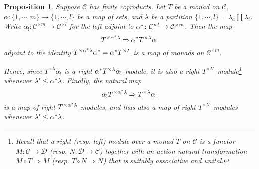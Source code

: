 \documentclass[a4paper,10pt
,draft
]{article}%
\numberwithin{equation}{section}
\numberwithin{figure}{section}
\newtheorem{proposition}[equation]{Proposition}%
\theoremstyle{definition} %
\newcommand{\C}{\ensuremath{\mathcal C}}
\newcommand{\1}{\ensuremath{\mathbbm 1}}%
\begin{document}
\begin{proposition}\label{MONADICFUN PROP}
	Suppose $\C$ has finite coproducts.
	Let $T$ be a monad on $\C$,
	$\alpha \colon \{1,\cdots,m\} \to \{1,\cdots,l\}$ be a map of sets,
	and $\lambda$ be a partition $\{1,\cdots,l\} = \lambda_a \amalg \lambda_i$.
	Write $\alpha_{!} \colon \mathcal{C}^{\times m} \to 
	\mathcal{C}^{\times l}$
	for the left adjoint to 
	$\alpha^{\**} \colon \mathcal{C}^{\times l} \to 
	\mathcal{C}^{\times m}$.
% 	 
	Then the map
\begin{equation}\label{MONADFUNCTORALPHA EQ}
	T^{\times \alpha^{\**} \lambda} \Rightarrow \alpha^{\**} T^{\times \lambda} \alpha_{!}
\end{equation}
adjoint to the identity 
$T^{\times \alpha^{\**}\lambda} \alpha^{\**} =
\alpha^{\**} T^{\times \lambda}$
is a map of monads on $\C^{\times m}$.

Hence, since $T^{\times \lambda} \alpha_!$ is a right 
$\alpha^{\**} T^{\times \lambda}\alpha_{!}$-module, 
it is also a right $T^{\times \lambda'}$-module\footnote{
Recall that a right (resp. left) module
over a monad $T$ on $\mathcal{C}$
is a functor $M \colon \mathcal{C} \to \mathcal{D}$
(resp. $N \colon \mathcal{D} \to \mathcal{C}$)
together with an action natural transformation
$M \circ T \Rightarrow M$
(resp. $T \circ N \Rightarrow N$)
that is suitably associative and unital.}
whenever
$\lambda' \leq \alpha^{\**} \lambda$.
Finally, the natural map 
\begin{equation}\label{MONADFUNCTORALPHADOU EQ}
	\alpha_{!} T^{\times \alpha^{\**} \lambda} \Rightarrow  T^{\times \lambda} \alpha_{!}
\end{equation}
is a map of right $T^{\times \alpha^{\**} \lambda}$-modules, 
and thus also a map of right 
$T^{\times \lambda'}$-modules
whenever $\lambda' \leq \alpha^{\**} \lambda$.
\end{proposition}

\end{document}
